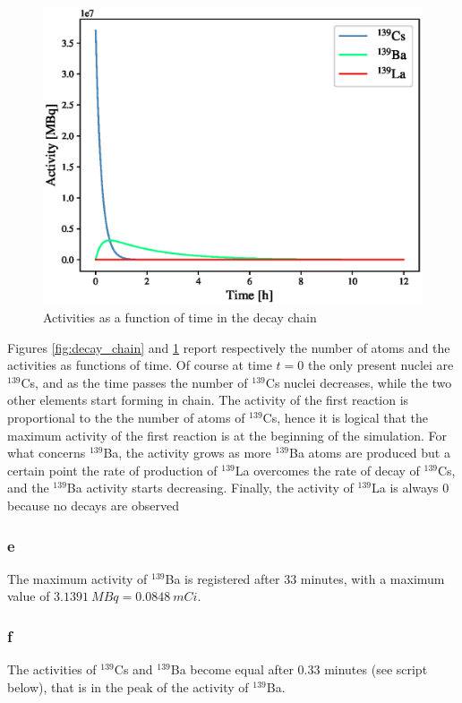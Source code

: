 \begin{figure}[htbp]
    \centering
    \includegraphics[scale=0.8]{ex7/decay_activities.eps}
    \caption{Activities as a function of time in the decay chain}
    \label{fig:decay_chain_activities}
\end{figure}

Figures \ref{fig:decay_chain} and \ref{fig:decay_chain_activities} report respectively
the number of atoms and the activities as functions of time. Of course at time $t=0$ the only present nuclei are $^{139}$Cs, and as the time passes 
the number of $^{139}$Cs nuclei decreases, while the two other elements start forming in chain. The activity of the first reaction is proportional to the 
the number of atoms of $^{139}$Cs, hence it is logical that the maximum activity of the first reaction is at the beginning of the simulation. For what concerns
$^{139}$Ba, the activity grows as more $^{139}$Ba atoms are produced but a certain point the rate of production of $^{139}$La overcomes the rate of decay of $^{139}$Cs,
and the $^{139}$Ba activity starts decreasing. Finally, the activity of $^{139}$La is always $0$ because no decays are observed

\subsubsection*{e}
The maximum activity of $^{139}$Ba is registered after $33$ minutes, with a maximum value of $3.1391~MBq = 0.0848~mCi$.

\subsubsection*{f}
The activities of $^{139}$Cs and $^{139}$Ba become equal after $0.33$ minutes (see script below), that is in the peak of the activity of  $^{139}$Ba.